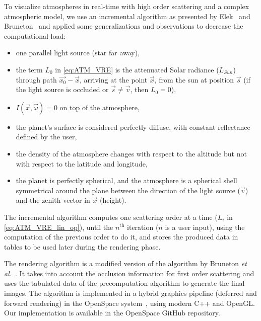 \documentclass[journal]{vgtc}                %
\newcommand{\etal}{\emph{et al.}}
\begin{document}
To visualize atmospheres in real-time with high order scattering and a complex atmospheric model, we use an incremental algorithm as presented by Elek~\cite{Elek:2009} and Bruneton~\cite{BrunetonNeyret:2008} and applied some generalizations and observations to decrease the computational load:
\begin{itemize}
	\vspace{-2.5mm}
	\item one parallel light source (star far away),
	\vspace{-2.5mm}
	\item the term $L_0$ in \autoref{eq:ATM_VRE} is the attenuated Solar radiance ($L_{Sun}$) through path $\vec{x_0}-\vec{x}$, arriving at the point $\vec{x}$, from the sun at position $\vec{s}$ (if the light source is occluded or $\vec{s} \neq \vec{v}$, then $L_0 = 0$),
	\vspace{-2.5mm}
	\item $I(\vec{x}, \vec{\omega}) = 0$ on top of the atmosphere,
	\vspace{-2.5mm}
	\item the planet's surface is considered perfectly diffuse, with constant reflectance defined by the user,
	\vspace{-2.5mm}
	\item the density of the atmosphere changes with respect to the altitude but not with respect to the latitude and longitude,
	\vspace{-2.5mm}
	\item the planet is perfectly spherical, and the atmosphere is a spherical shell symmetrical around the plane between the direction of the light source ($\vec{v}$) and the zenith vector in $\vec{x}$ (height).
	\vspace{-2.5mm}
\end{itemize}

The incremental algorithm computes one scattering order at a time ($L_i$ in \autoref{eq:ATM_VRE_lin_op}), until the $n^{\text{th}}$ iteration ($n$ is a user input), using the computation of the previous order to do it, and stores the produced data in tables to be used later during the rendering phase.

The rendering algorithm is a modified version of the algorithm by Bruneton \etal ~\cite{BrunetonNeyret:2008}. It takes into account the occlusion information for first order scattering and uses the tabulated data of the precomputation algorithm to generate the final images. The algorithm is implemented in a hybrid graphics pipeline (deferred and forward rendering) in the OpenSpace system~\cite{OpenSpace:2020, bock18openspace}, using modern C++ and OpenGL. Our implementation is available in the OpenSpace GitHub repository.
\end{document}
